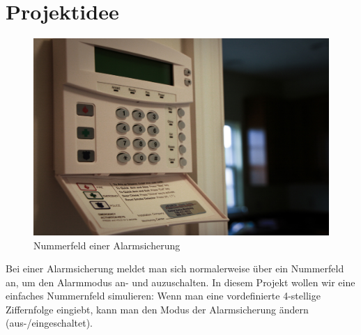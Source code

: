 
\chapter{Projektidee}\label{projektidee}

\begin{figure}[htbp]
\centering
\includegraphics{images/keypad.jpg}
\caption{Nummerfeld einer Alarmsicherung\footnotemark}
\end{figure}

Bei einer Alarmsicherung meldet man sich normalerweise über ein
Nummerfeld an, um den Alarmmodus an- und auzuschalten. In diesem Projekt
wollen wir eine einfaches Nummernfeld simulieren: Wenn man eine
vordefinierte 4-stellige Ziffernfolge eingiebt, kann man den Modus der
Alarmsicherung ändern (aus-/eingeschaltet).
